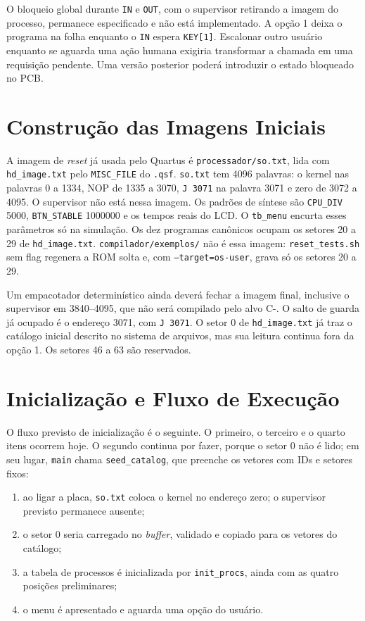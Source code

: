 \documentclass[
    12pt,
    openright,
    a4paper,
    english,
    brazilian
]{abntex2}
\begin{document}
O bloqueio global durante \texttt{IN} e \texttt{OUT}, com o supervisor retirando a imagem do processo, permanece especificado e não está implementado. A opção 1 deixa o programa na folha enquanto o \texttt{IN} espera \texttt{KEY[1]}. Escalonar outro usuário enquanto se aguarda uma ação humana exigiria transformar a chamada em uma requisição pendente. Uma versão posterior poderá introduzir o estado bloqueado no PCB.

\section{Construção das Imagens Iniciais}

A imagem de \emph{reset} já usada pelo Quartus é \texttt{processador/so.txt}, lida com \texttt{hd\_image.txt} pelo \texttt{MISC\_FILE} do \texttt{.qsf}. \texttt{so.txt} tem 4096 palavras: o kernel nas palavras 0 a 1334, NOP de 1335 a 3070, \texttt{J 3071} na palavra 3071 e zero de 3072 a 4095. O supervisor não está nessa imagem. Os padrões de síntese são \texttt{CPU\_DIV} 5000, \texttt{BTN\_STABLE} 1000000 e os tempos reais do LCD. O \texttt{tb\_menu} encurta esses parâmetros só na simulação. Os dez programas canônicos ocupam os setores 20 a 29 de \texttt{hd\_image.txt}. \texttt{compilador/exemplos/} não é essa imagem: \texttt{reset\_tests.sh} sem flag regenera a ROM solta e, com \texttt{--target=os-user}, grava só os setores 20 a 29.

Um empacotador determinístico ainda deverá fechar a imagem final, inclusive o supervisor em 3840--4095, que não será compilado pelo alvo C-. O salto de guarda já ocupado é o endereço 3071, com \texttt{J 3071}. O setor 0 de \texttt{hd\_image.txt} já traz o catálogo inicial descrito no sistema de arquivos, mas sua leitura continua fora da opção 1. Os setores 46 a 63 são reservados.

\section{Inicialização e Fluxo de Execução}

O fluxo previsto de inicialização é o seguinte. O primeiro, o terceiro e o quarto itens ocorrem hoje. O segundo continua por fazer, porque o setor 0 não é lido; em seu lugar, \texttt{main} chama \texttt{seed\_catalog}, que preenche os vetores com IDs e setores fixos:

\begin{enumerate}
    \item ao ligar a placa, \texttt{so.txt} coloca o kernel no endereço zero; o supervisor previsto permanece ausente;
    \item o setor 0 seria carregado no \emph{buffer}, validado e copiado para os vetores do catálogo;
    \item a tabela de processos é inicializada por \texttt{init\_procs}, ainda com as quatro posições preliminares;
    \item o menu é apresentado e aguarda uma opção do usuário.
\end{enumerate}
\end{document}
